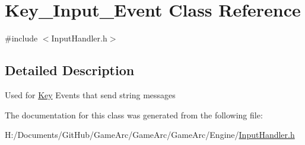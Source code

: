 \hypertarget{class_key___input___event}{\section{Key\+\_\+\+Input\+\_\+\+Event Class Reference}
\label{class_key___input___event}
}


{\ttfamily \#include $<$Input\+Handler.\+h$>$}



\subsection{Detailed Description}
Used for \hyperlink{class_key}{Key} Events that send string messages 

The documentation for this class was generated from the following file\+:\begin{DoxyCompactItemize}
\item 
H\+:/\+Documents/\+Git\+Hub/\+Game\+Arc/\+Game\+Arc/\+Game\+Arc/\+Engine/\hyperlink{_input_handler_8h}{Input\+Handler.\+h}\end{DoxyCompactItemize}
